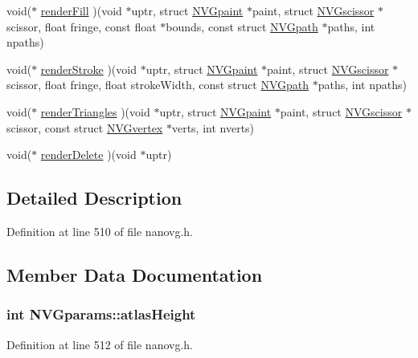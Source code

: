 \begin{DoxyCompactItemize}
void($\ast$ \hyperlink{struct_n_v_gparams_ac484f24518e2653dea0739b7f35a8614}{render\+Fill} )(void $\ast$uptr, struct \hyperlink{struct_n_v_gpaint}{N\+V\+Gpaint} $\ast$paint, struct \hyperlink{struct_n_v_gscissor}{N\+V\+Gscissor} $\ast$scissor, float fringe, const float $\ast$bounds, const struct \hyperlink{struct_n_v_gpath}{N\+V\+Gpath} $\ast$paths, int npaths)
\item 
void($\ast$ \hyperlink{struct_n_v_gparams_a9b56486a8c43791466312e5b886539e0}{render\+Stroke} )(void $\ast$uptr, struct \hyperlink{struct_n_v_gpaint}{N\+V\+Gpaint} $\ast$paint, struct \hyperlink{struct_n_v_gscissor}{N\+V\+Gscissor} $\ast$scissor, float fringe, float stroke\+Width, const struct \hyperlink{struct_n_v_gpath}{N\+V\+Gpath} $\ast$paths, int npaths)
\item 
void($\ast$ \hyperlink{struct_n_v_gparams_ac8410294c4712cda7b1754f123a9c4d5}{render\+Triangles} )(void $\ast$uptr, struct \hyperlink{struct_n_v_gpaint}{N\+V\+Gpaint} $\ast$paint, struct \hyperlink{struct_n_v_gscissor}{N\+V\+Gscissor} $\ast$scissor, const struct \hyperlink{struct_n_v_gvertex}{N\+V\+Gvertex} $\ast$verts, int nverts)
\item 
void($\ast$ \hyperlink{struct_n_v_gparams_a92fc1339d100af7cc4b5fdeb7b36e63c}{render\+Delete} )(void $\ast$uptr)
\end{DoxyCompactItemize}


\subsection{Detailed Description}


Definition at line 510 of file nanovg.\+h.



\subsection{Member Data Documentation}
\hypertarget{struct_n_v_gparams_a835232ed4e66c1cdbd8ed74ff822dde1}{
\subsubsection[{atlas\+Height}]{\setlength{\rightskip}{0pt plus 5cm}int N\+V\+Gparams\+::atlas\+Height}}\label{struct_n_v_gparams_a835232ed4e66c1cdbd8ed74ff822dde1}


Definition at line 512 of file nanovg.\+h.

